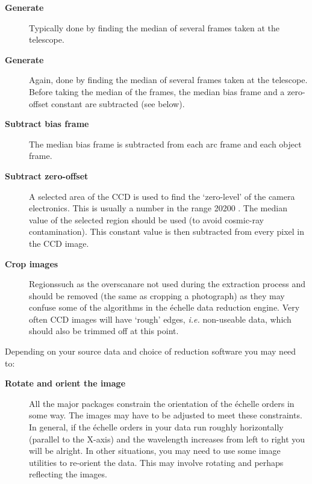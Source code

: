 \begin{description}

\item [{\bf Generate }]
      Typically done by finding the median of several frames taken at
      the telescope.

\item [{\bf Generate }]
      Again, done by finding the median of several frames taken at
      the telescope.  Before taking the median of the frames, the
      median bias frame and a zero-offset constant are subtracted
      (see below).

\item [{\bf Subtract bias frame}]
      The median bias frame is subtracted from each arc frame and
      each object frame.

\item [{\bf Subtract zero-offset}]
      A selected area of the CCD 
      is used to find the
      `zero-level' of the camera electronics.  This is usually a number
      in the range 20\sgspec{--}{-}200 \@.
      The median value of the selected region
      should be used (to avoid cosmic-ray contamination).  This constant
      value is then subtracted from every pixel in the CCD image.

\item [{\bf Crop images}]
      Regions\sgspec{---}{ - }such as the overscan\sgspec{---}{ - }are
      not used during the extraction
      process and should be removed (the same as cropping a photograph)
      as they may confuse some of the algorithms in the \'{e}chelle data
      reduction engine.  Very often CCD images will have `rough' edges,
      {\em i.e.} non-useable data, which should also be trimmed off at
      this point.

\end{description}

Depending on your source data and choice of reduction software you may
need to:

\begin{description}

\item [{\bf Rotate and orient the image}]
      All the major packages constrain the orientation of the \'{e}chelle
      orders in some way.  The images may have to be adjusted to meet
      these constraints.
      In general, if the \'{e}chelle orders in your data run roughly
      horizontally (parallel to the X-axis) and the wavelength increases
      from left to right you will be alright.
      In other situations, you may need to use some image utilities to
      re-orient the data.
      This may involve rotating and perhaps reflecting the images.

\end{description}

